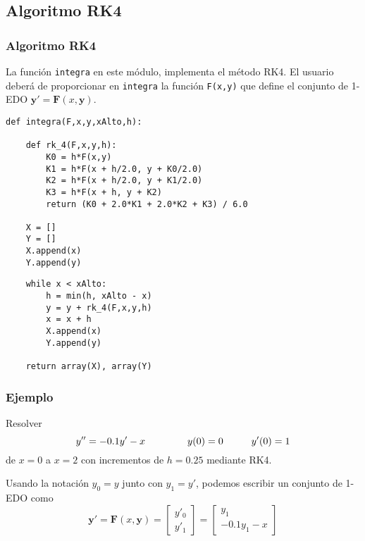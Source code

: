 \subsection{Algoritmo RK4}
\begin{frame}
\frametitle{Algoritmo RK4}
La función \texttt{integra} en este módulo, implementa el método RK4. El usuario deberá de proporcionar en \texttt{integra} la función \texttt{F(x,y)} que define el conjunto de 1-EDO $\mathbf{y}' = \mathbf{F}(x,\mathbf{y})$. 
\end{frame}
\begin{frame}[fragile]
\begin{lstlisting}
def integra(F,x,y,xAlto,h):
    
    def rk_4(F,x,y,h):
        K0 = h*F(x,y)
        K1 = h*F(x + h/2.0, y + K0/2.0)
        K2 = h*F(x + h/2.0, y + K1/2.0)
        K3 = h*F(x + h, y + K2)
        return (K0 + 2.0*K1 + 2.0*K2 + K3) / 6.0
    
    X = []
    Y = []
    X.append(x)
    Y.append(y)
\end{lstlisting}
\end{frame}
\begin{frame}[fragile]
\begin{lstlisting}
    while x < xAlto:
        h = min(h, xAlto - x)
        y = y + rk_4(F,x,y,h)
        x = x + h
        X.append(x)
        Y.append(y)
    
    return array(X), array(Y)
\end{lstlisting}
\end{frame}
\begin{frame}
\frametitle{Ejemplo}
Resolver
\[ y'' = -0.1 y' - x \hspace{1.5cm} y(0) = 0 \hspace{1cm} y'(0)=1\]
de $x=0$ a $x=2$ con incrementos de $h=0.25$ mediante RK4.
\end{frame}
\begin{frame}
Usando la notación $y_{0}= y$ junto con $y_{1} = y'$, podemos escribir un conjunto de 1-EDO como
\begin{equation*} 
\mathbf{y}' = \mathbf{F}(x,\mathbf{y}) =
\begin{bmatrix}
y'_{0} \\
y'_{1}
\end{bmatrix} = 
\begin{bmatrix}
y_{1} \\
-0.1 y_{1} - x
\end{bmatrix}
\end{equation*}
\end{frame}
